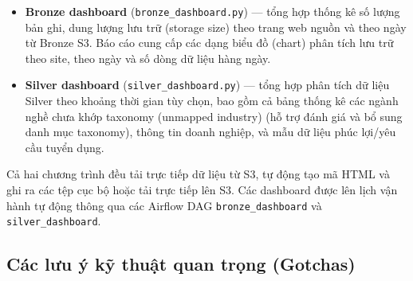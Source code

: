 \begin{itemize}
  \item \textbf{Bronze dashboard} (\texttt{bronze\_dashboard.py}) — tổng
    hợp thống kê số lượng bản ghi, dung lượng lưu trữ (storage size) theo trang web nguồn và theo ngày từ Bronze
    S3. Báo cáo cung cấp các dạng biểu đồ (chart) phân tích lưu trữ theo site, theo ngày và số dòng dữ liệu hàng ngày.
  \item \textbf{Silver dashboard} (\texttt{silver\_dashboard.py}) — tổng
    hợp phân tích dữ liệu Silver theo khoảng thời gian tùy chọn, bao gồm cả bảng thống kê các ngành nghề chưa khớp taxonomy (unmapped industry)
    (hỗ trợ đánh giá và bổ sung danh mục taxonomy), thông tin doanh nghiệp, và mẫu dữ liệu phúc lợi/yêu cầu tuyển dụng.
\end{itemize}

Cả hai chương trình đều tải trực tiếp dữ liệu từ S3, tự động tạo mã HTML và ghi ra các tệp cục bộ hoặc tải trực tiếp lên S3.
Các dashboard được lên lịch vận hành tự động thông qua các Airflow DAG \texttt{bronze\_dashboard} và \texttt{silver\_dashboard}.


\subsection{Các lưu ý kỹ thuật quan trọng (Gotchas)}
\label{subsec:processing-gotchas}

